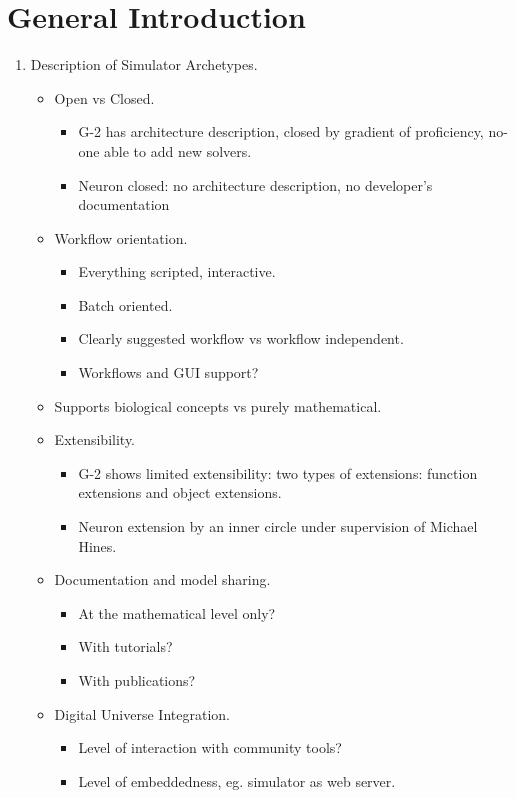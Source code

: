 \documentclass[12pt]{article}
\begin{document}


\section{General Introduction}

\begin{enumerate}
\item Description of Simulator Archetypes.
  \begin{itemize}
  \item Open vs Closed.
    \begin{itemize}
    \item G-2 has architecture description, closed by gradient of
      proficiency, no-one able to add new solvers.
    \item Neuron closed: no architecture description, no developer's
      documentation
    \end{itemize}
  \item Workflow orientation.
    \begin{itemize}
    \item Everything scripted, interactive.
    \item Batch oriented.
    \item Clearly suggested workflow vs workflow independent.
    \item Workflows and GUI support?
    \end{itemize}
  \item Supports biological concepts vs purely mathematical.
  \item Extensibility.
    \begin{itemize}
    \item G-2 shows limited extensibility: two types of extensions:
      function extensions and object extensions.
    \item Neuron extension by an inner circle under supervision of
      Michael Hines.
    \end{itemize}
  \item Documentation and model sharing.
    \begin{itemize}
    \item At the mathematical level only?
    \item With tutorials?
    \item With publications?
    \end{itemize}
  \item Digital Universe Integration.
    \begin{itemize}
    \item Level of interaction with community tools?
    \item Level of embeddedness, eg. simulator as web server.
    \end{itemize}
  \end{itemize}
\end{enumerate}
\end{document}
